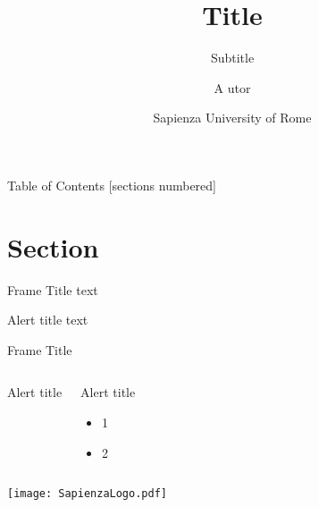 \documentclass[11pt,aspectratio=43]{beamer}
\title[Title]{Title}
\subtitle{Subtitle}
\author[A.utor]{A utor}
\date[uniroma1]{Sapienza University of Rome}
\institute{\hspace{60mm}
\texttt{[image: SapienzaLogo.pdf]}
\hspace{10mm}
\texttt{[image: logo\_ispamm.pdf]}}
\begin{document}
	
	\maketitle
    
	\begin{frame}{Table of Contents}
		[sections numbered]
		\tableofcontents[hideallsubsections]
	\end{frame}
    
	\section{Section}
    
	\begin{frame}{Frame Title}
	    text
		\begin{alertblock}{Alert title}
    		text
		\end{alertblock}
	\end{frame}
    
	\begin{frame}{Frame Title}
	
		\begin{columns}[T]
	        \begin{exampleblock}{Alert title}
		    \end{exampleblock}
			
			\begin{alertblock}{Alert title}
				\begin{itemize}
					\item<+->1
					\item<+-> 2
				\end{itemize}
			\end{alertblock}
		\end{columns}
	\end{frame}

	\appendix
	

	\begin{frame}[standout]
	    \vspace{10mm}
		\texttt{[image: SapienzaLogo.pdf]}
	\end{frame}
\end{document}

